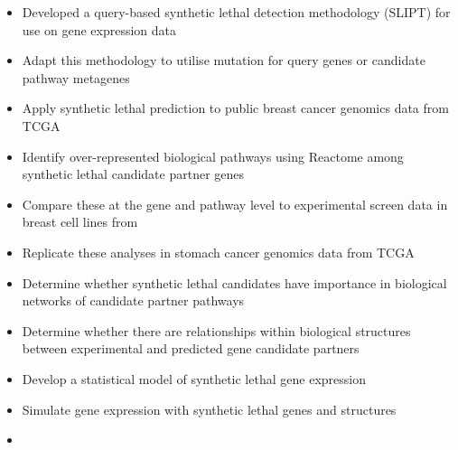\iffalse
\begin{itemize}

\item 

Developed a query-based \gls{synthetic lethal} detection methodology (\gls{SLIPT}) for use on \gls{gene expression} data

\item 

Adapt this methodology to utilise  \gls{mutation} for query genes or candidate pathway \glspl{metagene}

\item 

Apply \Gls{synthetic lethal} prediction to public breast cancer \glspl{genomic} data from \gls{TCGA} \citep{TCGA2012}

\item 

Identify over-represented biological pathways using Reactome \citep{Reactome} among \gls{synthetic lethal} candidate partner genes

\item

Compare these at the gene and pathway level to experimental screen data in breast cell lines from \citet{Telford2015}

\item

Replicate these analyses in stomach cancer \glspl{genomic} data from \gls{TCGA} \citep{TCGA2014GC}

\item

Determine whether \gls{synthetic lethal} candidates have importance in biological networks of candidate partner pathways 

\item

Determine whether there are relationships within biological  structures between experimental and predicted gene candidate partners 

\item

Develop a statistical model of \gls{synthetic lethal} \gls{gene expression}

\item

Simulate \gls{gene expression} with \gls{synthetic lethal} genes and  structures

\item


\end{itemize}
